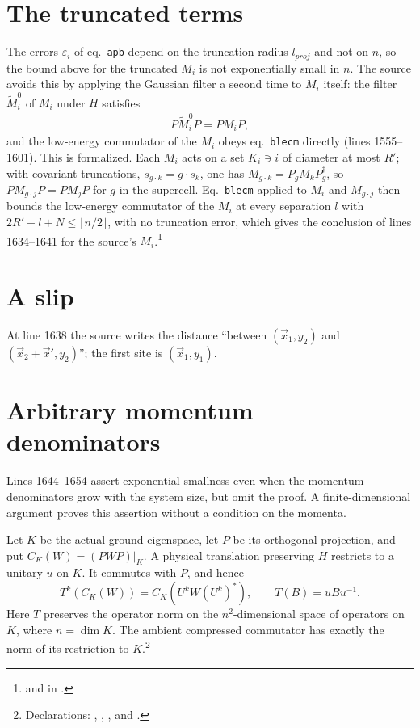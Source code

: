 \documentclass{article}
\begin{document}
\section{The truncated terms}
The errors $\varepsilon_i$ of eq.~\texttt{apb} depend on the truncation radius
$l_{proj}$ and not on $n$, so the bound above for the truncated $M_i$ is not
exponentially small in $n$. The source avoids this by applying the Gaussian
filter a second time to $M_i$ itself: the filter $\tilde M_i^0$ of $M_i$
under $H$ satisfies
\begin{align}
    P\tilde M_i^0P=PM_iP,
    \label{eq:hastings05_translation_supercell_second_filter}
\end{align}
and the
low-energy commutator of the $M_i$ obeys eq.~\texttt{blecm} directly
(lines 1555--1601). This is formalized. Each $M_i$ acts on a set $K_i\ni i$ of
diameter at most $R'$; with covariant truncations, $s_{g\cdot k}=g\cdot s_k$,
one has $M_{g\cdot k}=P_gM_kP_g^\dagger$, so $PM_{g\cdot j}P=PM_jP$ for $g$ in
the supercell. Eq.~\texttt{blecm} applied to $M_i$ and $M_{g\cdot j}$ then
bounds the low-energy commutator of the $M_i$ at every separation $l$ with
$2R'+l+N\le\lfloor n/2\rfloor$, with no truncation error, which gives the
conclusion of lines 1634--1641 for the source's
$M_i$.\footnote{ and
    in .}

\section{A slip}
At line 1638 the source writes the distance ``between $(\vec x_1,y_2)$ and
$(\vec x_2+\vec x',y_2)$''; the first site is $(\vec x_1,y_1)$.

\section{Arbitrary momentum denominators}

Lines 1644--1654 assert exponential smallness even when the momentum
denominators grow with the system size, but omit the proof. A
finite-dimensional argument proves this assertion without a condition on
the momenta.

Let $K$ be the actual ground eigenspace, let $P$ be its orthogonal
projection, and put $C_K(W)=(PWP)|_K$. A physical translation preserving
$H$ restricts to a unitary $u$ on $K$. It commutes with $P$, and hence
\[
 T^k(C_K(W))=C_K(U^kW(U^k)^*),\qquad T(B)=uBu^{-1}.
\]
Here $T$ preserves the operator norm on the $n^2$-dimensional space of
operators on $K$, where $n=\dim K$. The ambient compressed commutator
has exactly the norm of its restriction to $K$.\footnote{Declarations:
,
,
, and
.}
\end{document}
